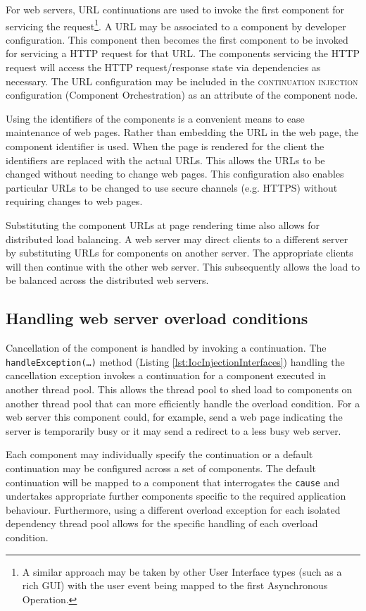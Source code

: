 \documentclass[prodmode]{style/acmlarge}
\begin{document}
For web servers, URL continuations \cite{url-continuation} are used to invoke
the first component for servicing the request\footnote{A similar approach may be
taken by other User Interface types (such as a rich GUI) with the user event
being mapped to the first Asynchronous Operation.}.  A URL may be associated to
a component by developer configuration.  This component then becomes the first
component to be invoked for servicing a HTTP request for that URL.  The
components servicing the HTTP request will access the HTTP request/response
state via dependencies as necessary.  The URL configuration may be included in
the \textsc{continuation injection} configuration (Component Orchestration) as
an attribute of the component node.

Using the identifiers of the components is a convenient means to ease
maintenance of web pages.  Rather than embedding the URL in the web page, the
component identifier is used.  When the page is rendered for the client the
identifiers are replaced with the actual URLs.  This allows the URLs to be
changed without needing to change web pages.  This configuration also enables
particular URLs to be changed to use secure channels (e.g. HTTPS) without
requiring changes to web pages.

Substituting the component URLs at page rendering time also allows for
distributed load balancing.  A web server may direct clients to a different
server by substituting URLs for components on another server. The appropriate
clients will then continue with the other web server.  This subsequently allows the
load to be balanced across the distributed web servers.


\subsection{Handling web server overload conditions}

Cancellation of the component is handled by invoking a continuation.  The
\texttt{handle\-Exception(\ldots)} method (Listing \ref{lst:IocInjectionInterfaces})
handling the cancellation exception invokes a continuation for a component
executed in another thread pool.  This allows the thread pool to shed load to
components on another thread pool that can more efficiently handle the overload
condition.  For a web server this component could, for example, send a web page
indicating the server is temporarily busy or it may send a redirect to a less
busy web server.

Each component may individually specify the continuation or a default
continuation may be configured across a set of components.
The default continuation will be mapped to a component that interrogates the
\texttt{cause} and undertakes appropriate further components specific to the
required application behaviour.  Furthermore, using a different overload
exception for each isolated dependency thread pool allows for the specific
handling of each overload condition.
\end{document}
